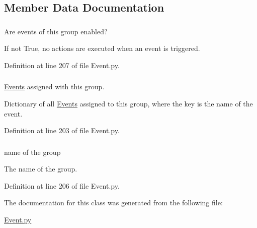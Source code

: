 \subsection{Member Data Documentation}
\hypertarget{class_event_1_1_event_group_af1cda284012e3badea391a0f9573c964}{
\subsubsection[{\_\-\_\-enabled}]{}}
\label{class_event_1_1_event_group_af1cda284012e3badea391a0f9573c964}


Are events of this group enabled? 

If not True, no actions are executed when an event is triggered. 

Definition at line 207 of file Event.py.

\hypertarget{class_event_1_1_event_group_ac27ccf54470339b7343b424c86da8ab9}{
\subsubsection[{\_\-\_\-events}]{}}
\label{class_event_1_1_event_group_ac27ccf54470339b7343b424c86da8ab9}


\hyperlink{namespace_event}{Events} assigned with this group. 

Dictionary of all \hyperlink{namespace_event}{Events} assigned to this group, where the key is the name of the event. 

Definition at line 203 of file Event.py.

\hypertarget{class_event_1_1_event_group_a5d5ff8c585cc7abeb5e50d1c81d40813}{
\subsubsection[{name}]{}}
\label{class_event_1_1_event_group_a5d5ff8c585cc7abeb5e50d1c81d40813}


name of the group 

The name of the group. 

Definition at line 206 of file Event.py.



The documentation for this class was generated from the following file:\begin{DoxyCompactItemize}
\item 
\hyperlink{_event_8py}{Event.py}\end{DoxyCompactItemize}
